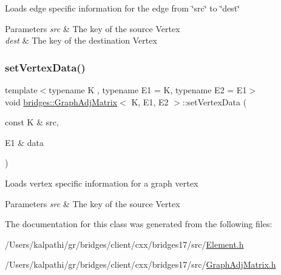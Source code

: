 Loads edge specific information for the edge from \char`\"{}src\char`\"{} to \char`\"{}dest\char`\"{}


\begin{DoxyParams}{Parameters}
{\em src} & The key of the source Vertex \\
\hline
{\em dest} & The key of the destination Vertex \\
\hline
\end{DoxyParams}
\mbox{\label{classbridges_1_1_graph_adj_matrix_a0dcc7220d850052aea47fccfd52192e0}} 
\subsubsection{\texorpdfstring{set\+Vertex\+Data()}{setVertexData()}}
{\footnotesize\ttfamily template$<$typename K , typename E1  = K, typename E2  = E1$>$ \\
void \mbox{\hyperlink{classbridges_1_1_graph_adj_matrix}{bridges\+::\+Graph\+Adj\+Matrix}}$<$ K, E1, E2 $>$\+::set\+Vertex\+Data (\begin{DoxyParamCaption}\item[{const K \&}]{src,  }\item[{E1 \&}]{data }\end{DoxyParamCaption})\hspace{0.3cm}{\ttfamily [inline]}}

Loads vertex specific information for a graph vertex


\begin{DoxyParams}{Parameters}
{\em src} & The key of the source Vertex \\
\hline
\end{DoxyParams}


The documentation for this class was generated from the following files\+:\begin{DoxyCompactItemize}
\item 
/\+Users/kalpathi/gr/bridges/client/cxx/bridges17/src/\mbox{\hyperlink{_element_8h}{Element.\+h}}\item 
/\+Users/kalpathi/gr/bridges/client/cxx/bridges17/src/\mbox{\hyperlink{_graph_adj_matrix_8h}{Graph\+Adj\+Matrix.\+h}}\end{DoxyCompactItemize}
